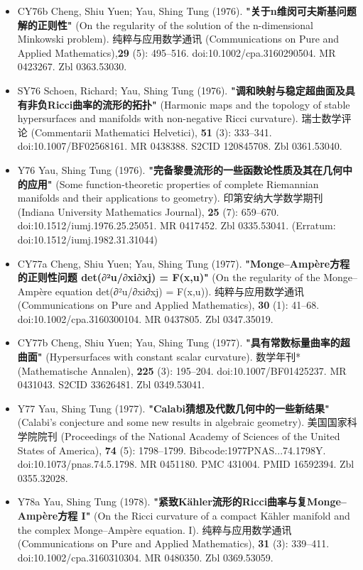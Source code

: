 \begin{itemize}
\item CY76b  Cheng, Shiu Yuen; Yau, Shing Tung (1976). \textbf{"关于n维闵可夫斯基问题解的正则性"} (On the regularity of the solution of the n-dimensional Minkowski problem). 纯粹与应用数学通讯 (Communications on Pure and Applied Mathematics),\textbf{29} (5): 495–516. doi:10.1002/cpa.3160290504. MR 0423267. Zbl 0363.53030.
\item SY76  Schoen, Richard; Yau, Shing Tung (1976). \textbf{"调和映射与稳定超曲面及具有非负Ricci曲率的流形的拓扑"} (Harmonic maps and the topology of stable hypersurfaces and manifolds with non-negative Ricci curvature). 瑞士数学评论 (Commentarii Mathematici Helvetici), \textbf{51} (3): 333–341. doi:10.1007/BF02568161. MR 0438388. S2CID 120845708. Zbl 0361.53040.
\item Y76  Yau, Shing Tung (1976). \textbf{"完备黎曼流形的一些函数论性质及其在几何中的应用"} (Some function-theoretic properties of complete Riemannian manifolds and their applications to geometry). 印第安纳大学数学期刊 (Indiana University Mathematics Journal), \textbf{25} (7): 659–670. doi:10.1512/iumj.1976.25.25051. MR 0417452. Zbl 0335.53041. (Erratum: doi:10.1512/iumj.1982.31.31044)
\item CY77a  Cheng, Shiu Yuen; Yau, Shing Tung (1977).\textbf{ "Monge–Ampère方程的正则性问题 det(∂²u/∂xi∂xj) = F(x,u)"} (On the regularity of the Monge–Ampère equation det(∂²u/∂xi∂xj) = F(x,u)). 纯粹与应用数学通讯(Communications on Pure and Applied Mathematics), \textbf{30} (1): 41–68. doi:10.1002/cpa.3160300104. MR 0437805. Zbl 0347.35019.
\item CY77b  Cheng, Shiu Yuen; Yau, Shing Tung (1977). \textbf{"具有常数标量曲率的超曲面"} (Hypersurfaces with constant scalar curvature). 数学年刊* (Mathematische Annalen), \textbf{225} (3): 195–204. doi:10.1007/BF01425237. MR 0431043. S2CID 33626481. Zbl 0349.53041.
\item Y77 Yau, Shing Tung (1977). \textbf{"Calabi猜想及代数几何中的一些新结果"} (Calabi's conjecture and some new results in algebraic geometry). 美国国家科学院院刊 (Proceedings of the National Academy of Sciences of the United States of America), \textbf{74} (5): 1798–1799. Bibcode:1977PNAS...74.1798Y. doi:10.1073/pnas.74.5.1798. MR 0451180. PMC 431004. PMID 16592394. Zbl 0355.32028.
\item Y78a Yau, Shing Tung (1978). \textbf{"紧致Kähler流形的Ricci曲率与复Monge–Ampère方程 I"} (On the Ricci curvature of a compact Kähler manifold and the complex Monge–Ampère equation. I). 纯粹与应用数学通讯 (Communications on Pure and Applied Mathematics), \textbf{31} (3): 339–411. doi:10.1002/cpa.3160310304. MR 0480350. Zbl 0369.53059.

\end{itemize}
